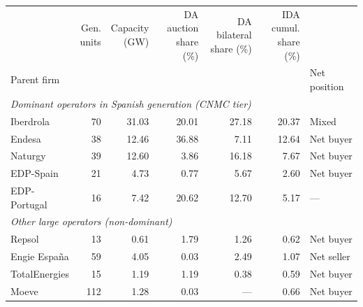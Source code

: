 \begin{tabular}{l r r r r r l}
\toprule
 & \makecell{Gen.\\units} & \makecell{Capacity\\(GW)} & \makecell{DA auction\\share (\%)} & \makecell{DA bilateral\\share (\%)} & \makecell{IDA cumul.\\share (\%)} & \\
Parent firm & & & & & & Net position \\
\midrule
\multicolumn{7}{l}{\textit{Dominant operators in Spanish generation (CNMC tier)}} \\
Iberdrola & 70 & 31.03 & 20.01 & 27.18 & 20.37 & Mixed \\
Endesa & 38 & 12.46 & 36.88 & 7.11 & 12.64 & Net buyer \\
Naturgy & 39 & 12.60 & 3.86 & 16.18 & 7.67 & Net buyer \\
EDP-Spain & 21 & 4.73 & 0.77 & 5.67 & 2.60 & Net buyer \\
EDP-Portugal & 16 & 7.42 & 20.62 & 12.70 & 5.17 & — \\
\midrule
\multicolumn{7}{l}{\textit{Other large operators (non-dominant)}} \\
Repsol & 13 & 0.61 & 1.79 & 1.26 & 0.62 & Net buyer \\
Engie España & 59 & 4.05 & 0.03 & 2.49 & 1.07 & Net seller \\
TotalEnergies & 15 & 1.19 & 1.19 & 0.38 & 0.59 & Net buyer \\
Moeve & 112 & 1.28 & 0.03 & — & 0.66 & Net buyer \\
\bottomrule
\end{tabular}